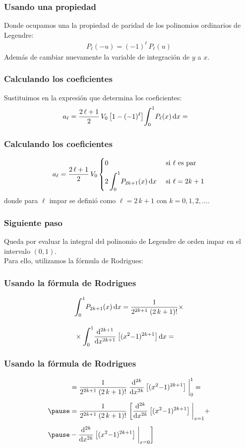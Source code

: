 \documentclass[12pt]{beamer}
\begin{document}
\begin{frame}
\frametitle{Usando una propiedad}
Donde ocupamos una la propiedad de paridad de los polinomios ordinarios de Legendre:
\pause
\begin{align*}
P_{\ell} (-u) = (-1)^{\ell} \, P_{\ell} (u)
\end{align*}
Además de cambiar nuevamente la variable de integración de $y$ a $x$.
\end{frame}
\begin{frame}
\frametitle{Calculando los coeficientes}
Sustituimos en la expresión que determina los coeficientes:
\pause
\begin{align*}
a_{\ell} &= \dfrac{2 \, \ell + 1}{2} \, V_{0} \,  \big[ 1 - (-1)^{\ell} \big] \scaleint{6ex}_{\bs 0}^{1} P_{\ell} (x) \dd{x} = 
\end{align*}
\end{frame}
\begin{frame}
\frametitle{Calculando los coeficientes}
\begin{align*}
a_{\ell} = \dfrac{2 \, \ell + 1}{2} \, V_{0} \begin{cases}
0 & \mbox{ si } \ell \mbox{ es par} \\[0.5em]
2 \, \displaystyle \scaleint{6ex}_{\bs 0}^{1} P_{2k+1} (x) \dd{x} & \mbox{ si } \ell = 2 k + 1 
\end{cases}
\end{align*}
donde para $\ell$ impar se definió como $\ell = 2 \, k + 1$ con $k = 0, 1, 2, \ldots$.
\end{frame}
\begin{frame}
\frametitle{Siguiente paso}
Queda por evaluar la integral del polinomio de Legendre de orden impar en el intervalo $(0, 1)$.
\\
\bigskip
\pause
Para ello, utilizamos la fórmula de Rodrigues:
\end{frame}
\begin{frame}
\frametitle{Usando la fórmula de Rodrigues}
\begin{eqnarray*}
\begin{aligned}
&\scaleint{6ex}_{\bs 0}^{1} P_{2k+1} (x) \dd{x} = \dfrac{1}{2^{2k+1} \; (2 \, k +1)!} \times \\[1em]
&\times \scaleint{6ex}_{\bs 0}^{1} \dv[2k+1]{x} \left[ (x^{2} {-} 1)^{2k+1} \right] \dd{x} = 
\end{aligned}
\end{eqnarray*}
\end{frame}
\begin{frame}
\frametitle{Usando la fórmula de Rodrigues}
\begin{eqnarray*}
\begin{aligned}
&= \dfrac{1}{2^{2k+1} \; (2 \, k +1)!} \; \dv[2k]{x} \left[ (x^{2} {-} 1)^{2k+1} \right] \eval_{0}^{1} = \\[0.5em] \pause
&= \dfrac{1}{2^{2k+1} \; (2 \, k +1)!} \; \bigg[ \dv[2k]{x} \left[ (x^{2} {-} 1)^{2k+1} \right] \eval_{x=1} + \\[0.5em] \pause
&- \dv[2k]{x} \left[ (x^{2} {-} 1)^{2k+1} \right] \eval_{x=0} \bigg]
\end{aligned}
\end{eqnarray*}
\end{frame}
\end{document}
